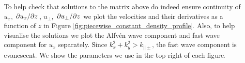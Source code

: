 To help check that solutions to the matrix above do indeed ensure continuity of $u_x$, $\pdv*{u_x}{z}$, $u_\perp$, $\pdv*{u_\perp}{z}$ we plot the velocities and their derivatives as a function of $z$ in Figure \ref{fig:piecewise_constant_density_profile}. Also, to help visualise the solutions we plot the Alfv\'en wave component and fast wave component for $u_x$ separately. Since $k_x^2+k_y^2>k_{||\pm}$, the fast wave component is evanescent.  We show the parameters we use in the top-right of each figure. 


